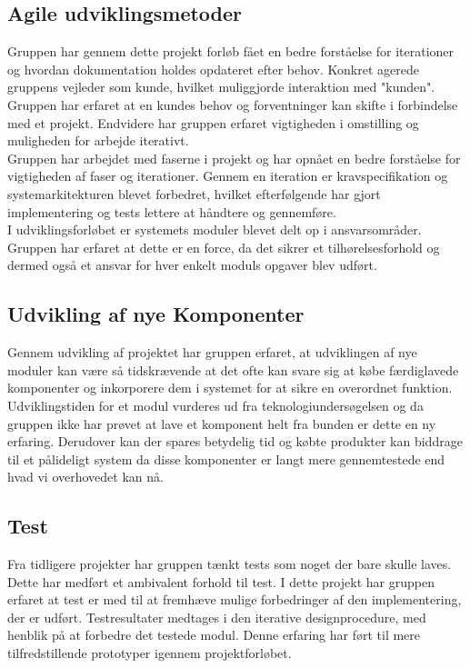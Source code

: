 \subsection{Agile udviklingsmetoder}
Gruppen har gennem dette projekt forløb fået en bedre forståelse for iterationer og hvordan dokumentation holdes opdateret efter behov. Konkret agerede gruppens vejleder som kunde, hvilket muliggjorde interaktion med "kunden". Gruppen har erfaret at en kundes behov og forventninger kan skifte i forbindelse med et projekt. Endvidere har gruppen erfaret vigtigheden i omstilling og muligheden for arbejde iterativt.\\
Gruppen har arbejdet med faserne i projekt og har opnået en bedre forståelse for vigtigheden af faser og iterationer. Gennem en iteration er kravspecifikation og systemarkitekturen blevet forbedret, hvilket efterfølgende har gjort implementering og tests lettere at håndtere og gennemføre.\\
I udviklingsforløbet er systemets moduler blevet delt op i ansvarsområder. Gruppen har erfaret at dette er en force, da det sikrer et tilhørelsesforhold og dermed også et ansvar for hver enkelt moduls opgaver blev udført.

\subsection{Udvikling af nye Komponenter}
Gennem udvikling af projektet har gruppen erfaret, at udviklingen af nye moduler kan være så tidskrævende at det ofte kan svare sig at købe færdiglavede komponenter og inkorporere dem i systemet for at sikre en overordnet funktion. Udviklingstiden for et modul vurderes ud fra teknologiundersøgelsen og da gruppen ikke har prøvet at lave et komponent helt fra bunden er dette en ny erfaring. Derudover kan der spares betydelig tid og købte produkter kan biddrage til et pålideligt system da disse komponenter er langt mere gennemtestede end hvad vi overhovedet kan nå.

\subsection{Test}
Fra tidligere projekter har gruppen tænkt tests som noget der bare skulle laves. Dette har medført et ambivalent forhold til test. I dette projekt har gruppen erfaret at test er med til at fremhæve mulige forbedringer af den implementering, der er udført. Testresultater medtages i den iterative designprocedure, med henblik på at forbedre det testede modul. Denne erfaring har ført til mere tilfredstillende prototyper igennem projektforløbet.